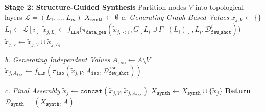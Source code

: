 \begin{algorithm*}
\begin{algorithmic}[1]
\vspace{0.3cm}

\Statex \textbf{Stage 2: Structure-Guided Synthesis}
\State Partition nodes $V$ into topological layers $\mathcal{L} = (L_1, \dots, L_m)$
\State $X_{\mathtt{synth}} \gets \emptyset$
    \Statex \hspace{\algorithmicindent} \textit{a. Generating Graph-Based Values}
    \State $\tilde{x}_{j,V} \gets \{\}$
        \State $L_i \gets \mathcal{L}[i]$
        \State $\tilde{x}_{j,L_i} \gets f_{\mathtt{LLM}}\Big(\pi_{\mathtt{data\_gen}}(\tilde{x}_{j,<i}, G[L_i \cup \Gamma^-(L_i)], L_i, \mathcal{D}_{\mathtt{few\_shot}}^i)\Big)$
        \State $\tilde{x}_{j,V} \gets \tilde{x}_{j,V} \cup \tilde{x}_{j,L_i}$
    \EndFor
    
    \Statex \hspace{\algorithmicindent} \textit{b. Generating Independent Values}
    \State $A_{\mathtt{iso}} \gets A \setminus V$
    \State $\tilde{x}_{j, A_{\mathtt{iso}}} \gets f_{\mathtt{LLM}}(\pi_{\mathtt{iso}}(\tilde{x}_{j,V}, A_{\mathtt{iso}}, \mathcal{D}_{\mathtt{few\_shot}}^{\mathtt{iso}}))$
    
    \Statex \hspace{\algorithmicindent} \textit{c. Final Assembly}
    \State $\tilde{x}_j \gets \mathtt{concat}(\tilde{x}_{j,V}, \tilde{x}_{j,A_{\mathtt{iso}}})$
    \State $X_{\mathtt{synth}} \gets X_{\mathtt{synth}} \cup \{\tilde{x}_j\}$
\EndFor
\State \textbf{Return} $\mathcal{D}_{\mathtt{synth}} = (X_{\mathtt{synth}}, A)$
\end{algorithmic}
\end{algorithm*}
